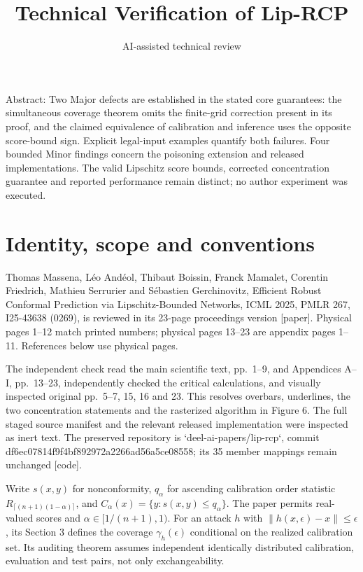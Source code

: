 \documentclass[10pt]{article}
\title{Technical Verification of Lip-RCP}
\author{AI-assisted technical review}
\date{}
\begin{document}
\maketitle
Abstract: Two Major defects are established in the stated core guarantees: the simultaneous coverage theorem omits the finite-grid correction present in its proof, and the claimed equivalence of calibration and inference uses the opposite score-bound sign. Explicit legal-input examples quantify both failures. Four bounded Minor findings concern the poisoning extension and released implementations. The valid Lipschitz score bounds, corrected concentration guarantee and reported performance remain distinct; no author experiment was executed.\par
\section*{Identity, scope and conventions}
Thomas Massena, Léo Andéol, Thibaut Boissin, Franck Mamalet, Corentin Friedrich, Mathieu Serrurier and Sébastien Gerchinovitz, Efficient Robust Conformal Prediction via Lipschitz-Bounded Networks, ICML 2025, PMLR 267, I25-43638 (0269), is reviewed in its 23-page proceedings version [paper]. Physical pages 1–12 match printed numbers; physical pages 13–23 are appendix pages 1–11. References below use physical pages.\par
The independent check read the main scientific text, pp. 1–9, and Appendices A–I, pp. 13–23, independently checked the critical calculations, and visually inspected original pp. 5–7, 15, 16 and 23. This resolves overbars, underlines, the two concentration statements and the rasterized algorithm in Figure 6. The full staged source manifest and the relevant released implementation were inspected as inert text. The preserved repository is `deel-ai-papers/lip-rcp`, commit df6ec07814f9f4bf892972a2266ad56a5ce08558; its 35 member mappings remain unchanged [code].\par
Write \(s(x,y)\) for nonconformity, \(q_\alpha\) for ascending calibration order statistic \(R_{\lceil(n+1)(1-\alpha)\rceil}\), and \(C_\alpha(x)=\{y:s(x,y)\le q_\alpha\}\). The paper permits real-valued scores and \(\alpha\in[1/(n+1),1)\). For an attack \(h\) with \(\|h(x,\epsilon)-x\|\le\epsilon\), its Section 3 defines the coverage \(\gamma_h(\epsilon)\) conditional on the realized calibration set. Its auditing theorem assumes independent identically distributed calibration, evaluation and test pairs, not only exchangeability.\par
\end{document}
